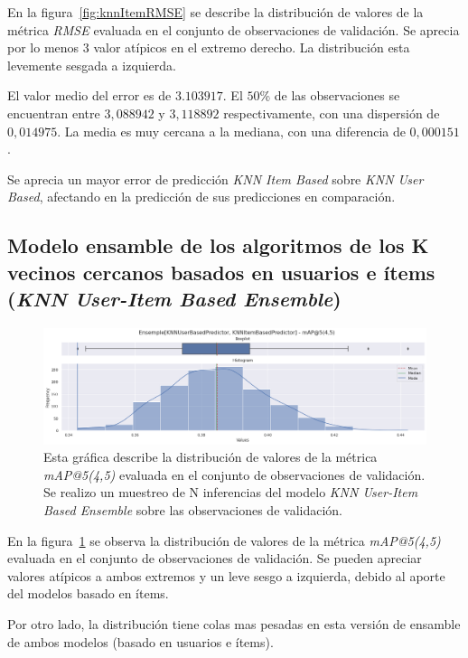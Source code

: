 \documentclass[11pt,a4paper,twoside]{thesis}
\begin{document}
En la figura~\ref{fig:knnItemRMSE} se describe la distribución de valores de la
métrica \textit{RMSE} evaluada en el conjunto de observaciones de validación.
Se aprecia por lo menos $3$ valor atípicos en el extremo derecho. La
distribución esta levemente sesgada a izquierda.

El valor medio del error es de $3.103917$. El $50$\% de las observaciones se
encuentran entre $3,088942$ y $3,118892$ respectivamente, con una dispersión de
$0,014975$. La media es muy cercana a la mediana, con una diferencia de
$0,000151$.

Se aprecia un mayor error de predicción \textit{KNN Item Based} sobre
\textit{KNN User Based}, afectando en la predicción de sus predicciones en
comparación.

\subsection{Modelo ensamble de los algoritmos de los K
	vecinos cercanos basados en usuarios e ítems
	(\textit{KNN User-Item Based Ensemble})
}

\begin{figure}[!htb]
	\centering
	\includegraphics[width=15cm]{./images/metrics-knn-ensemple-mapk.png}
	\caption{
		Esta gráfica describe la distribución de valores de la métrica
		\textit{mAP@5(4,5)} evaluada en el conjunto de observaciones de
		validación. Se realizo un muestreo de N inferencias del modelo
		\textit{KNN User-Item Based Ensemble} sobre las observaciones
		de validación.
	}
	\label{fig:knnEnsempleMAP}
\end{figure}

En la figura~\ref{fig:knnEnsempleMAP} se observa la distribución de valores de
la métrica \textit{mAP@5(4,5)} evaluada en el conjunto de observaciones de
validación. Se pueden apreciar valores atípicos a ambos extremos y un leve
sesgo a izquierda, debido al aporte del modelos basado en ítems.

Por otro lado, la distribución tiene colas mas pesadas en esta versión de
ensamble de ambos modelos (basado en usuarios e ítems).
\end{document}
